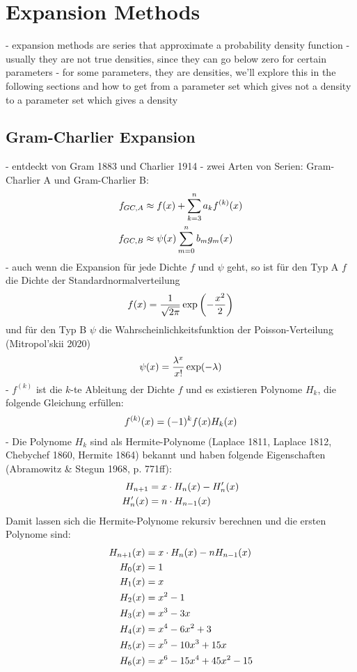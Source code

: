 \section{Expansion Methods}
- expansion methods are series that approximate a probability density function
- usually they are not true densities, since they can go below zero for certain parameters
- for some parameters, they are densities, we'll explore this in the following sections and how to get from a parameter set which gives not a density to a parameter set which gives a density

\subsection{Gram-Charlier Expansion}
- entdeckt von Gram 1883 und Charlier 1914
- zwei Arten von Serien: Gram-Charlier A und Gram-Charlier B:
\begin{align}
    f_{GC,A} &\approx f(x) + \sum_{k=3}^n a_k f^{(k)}(x) \notag \\
    f_{GC,B} &\approx \psi(x)\sum_{m=0}^n b_mg_m(x) \notag
\end{align}
- auch wenn die Expansion für jede Dichte $f$ und $\psi$ geht, so ist für den Typ A $f$ die Dichte der Standardnormalverteilung
\begin{align}
    f(x) = \frac{1}{\sqrt{2\pi}}\exp\left(-\frac{x^2}{2}\right) \notag
\end{align}
und für den Typ B $\psi$ die Wahrscheinlichkeitsfunktion der Poisson-Verteilung (Mitropol'skii 2020)
\begin{align}
    \psi(x) = \frac{\lambda^x}{x!}\exp(-\lambda) \notag
\end{align}
- $f^{(k)}$ ist die $k$-te Ableitung der Dichte $f$ und es existieren Polynome $H_k$, die folgende Gleichung erfüllen:
\begin{align}
    f^{(k)}(x) = (-1)^k f(x)H_k(x) \notag
\end{align}
- Die Polynome $H_k$ sind als Hermite-Polynome (Laplace 1811, Laplace 1812, Chebychef 1860, Hermite 1864) bekannt und haben folgende Eigenschaften (Abramowitz & Stegun 1968, p. 771ff):
\begin{align}
    H_{n+1} &= x\cdot H_n(x) - H'_n(x) \notag \\
    H'_n(x) &= n\cdot H_{n-1}(x) \notag \\
\end{align}
Damit lassen sich die Hermite-Polynome rekursiv berechnen und die ersten Polynome sind:
\begin{align}
    H_{n+1}(x) &= x\cdot H_n(x) - nH_{n-1}(x) \notag \\
    H_0(x) &= 1 \notag \\
    H_1(x) &= x \notag \\
    H_2(x) &= x^2 - 1 \notag \\
    H_3(x) &= x^3-3x \notag \\
    H_4(x) &= x^4-6x^2+3 \notag \\
    H_5(x) &= x^5-10x^3+15x \notag \\
    H_6(x) &= x^6-15x^4+45x^2-15 \notag
\end{align}
